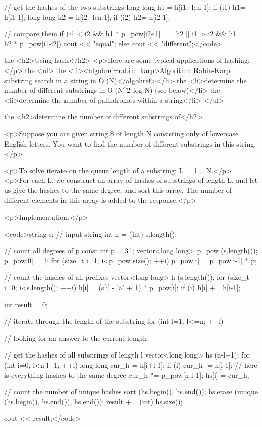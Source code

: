 // get the hashes of the two substrings
long long h1 = h[i1+len-1];
if (i1) h1= h[i1-1];
long long h2 = h[i2+len-1];
if (i2) h2= h[i2-1];

// compare them
if (i1 < i2 && h1 * p_pow[i2-i1] == h2 ||
i1 > i2 && h1 == h2 * p_pow[i1-i2])
cout << "equal";
else
cout << "different";</code>

the <h2>Using hash</h2>
<p>Here are some typical applications of hashing:</p>
the <ul>
the <li><algohref=rabin_karp>Algorithm Rabin-Karp substring search in a string in O (N)</algohref></li>
the <li>determine the number of different substrings in O (N^2 log N) (see below)</li>
the <li>determine the number of palindromes within a string</li>
</ul>

the <h2>determine the number of different substrings of</h2>

<p>Suppose you are given string S of length N consisting only of lowercase English letters. You want to find the number of different substrings in this string.</p>

<p>To solve iterate on the queue length of a substring: L = 1 .. N.</p>
<p>For each L, we construct an array of hashes of substrings of length L, and let us give the hashes to the same degree, and sort this array. The number of different elements in this array is added to the response.</p>

<p>Implementation:</p>

<code>string s; // input string
int n = (int) s.length();

// count all degrees of p
const int p = 31;
vector<long long> p_pow (s.length());
p_pow[0] = 1;
for (size_t i=1; i<p_pow.size(); ++i)
p_pow[i] = p_pow[i-1] * p;

// count the hashes of all prefixes
vector<long long> h (s.length());
for (size_t i=0; i<s.length(); ++i)
{
h[i] = (s[i] - 'a' + 1) * p_pow[i];
if (i) h[i] += h[i-1];
}

int result = 0;

// iterate through the length of the substring
for (int l=1; l<=n; ++l)
{
// looking for an answer to the current length

// get the hashes of all substrings of length l
vector<long long> hs (n-l+1);
for (int i=0; i<n-l+1; ++i)
{
long long cur_h = h[i+l-1];
if (i) cur_h -= h[i-1];
// here is everything hashes to the same degree
cur_h *= p_pow[n-i-1];
hs[i] = cur_h;
}

// count the number of unique hashes
sort (hs.begin(), hs.end());
hs.erase (unique (hs.begin(), hs.end()), hs.end());
result += (int) hs.size();
}

cout << result;</code>
